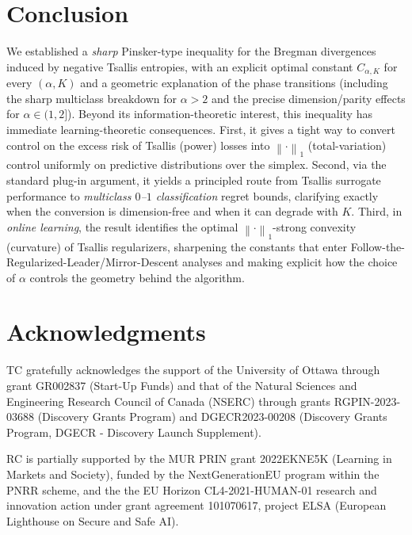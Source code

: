 \documentclass[11pt,oneside,a4paper]{article}
\newcommand{\lno}[1]{\left\lVert#1\right\rVert}
\theoremstyle{plain}
\theoremstyle{definition}
\theoremstyle{remark}
\begin{document}
\section{Conclusion}
We established a \emph{sharp} Pinsker-type inequality for the Bregman divergences induced by negative Tsallis entropies, with an explicit optimal constant $C_{\alpha,K}$ for every $(\alpha,K)$ and a geometric explanation of the phase transitions (including the sharp multiclass breakdown for $\alpha>2$ and the precise dimension/parity effects for $\alpha\in(1,2]$).
Beyond its information-theoretic interest, this inequality has immediate learning-theoretic consequences.
First, it gives a tight way to convert control on the excess risk of Tsallis (power) losses into $\lno{\cdot}_1$ (total-variation) control uniformly on predictive distributions over the simplex.
Second, via the standard plug-in argument, it yields a principled route from Tsallis surrogate performance to \emph{multiclass $0$--$1$ classification} regret bounds, clarifying exactly when the conversion is dimension-free and when it can degrade with $K$.
Third, in \emph{online learning}, the result identifies the optimal $\lno{\cdot}_1$-strong convexity (curvature) of Tsallis regularizers, sharpening the constants that enter Follow-the-Regularized-Leader/Mirror-Descent analyses and making explicit how the choice of $\alpha$ controls the geometry behind the algorithm.
\section*{Acknowledgments}

TC gratefully acknowledges the support of the University of Ottawa through grant GR002837 (Start-Up Funds) and that of the Natural Sciences and Engineering Research Council of Canada (NSERC) through grants RGPIN-2023-03688 (Discovery Grants Program) and DGECR2023-00208 (Discovery Grants Program, DGECR - Discovery Launch Supplement).

RC is partially supported by the MUR PRIN grant 2022EKNE5K (Learning in Markets and Society), funded by the NextGenerationEU program within the PNRR scheme, and the the EU Horizon CL4-2021-HUMAN-01 research and innovation action under grant agreement 101070617, project ELSA (European Lighthouse on Secure and Safe AI).

%
\end{document}
